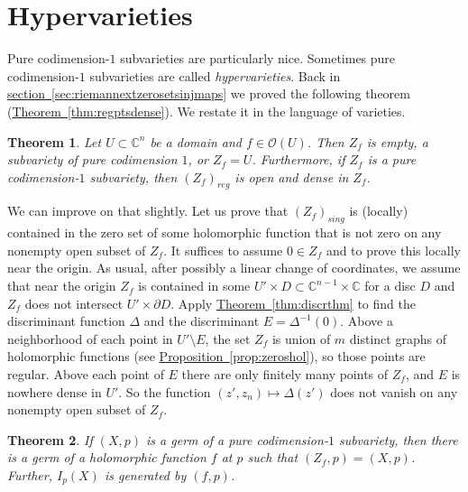 \documentclass[12pt,openany]{book}
\newcommand{\C}{{\mathbb{C}}}
\newcommand{\sO}{{\mathscr{O}}}
\theoremstyle{plain}
\newtheorem{thm}{Theorem}[section]
\theoremstyle{remark}
\theoremstyle{definition}
\theoremstyle{exercise}
\theoremstyle{example}
\newcommand{\sectionref}[1]{\hyperref[#1]{section~\ref*{#1}}}
\newcommand{\thmref}[1]{\hyperref[#1]{Theorem~\ref*{#1}}}
\newcommand{\propref}[1]{\hyperref[#1]{Proposition~\ref*{#1}}}
\begin{document}

\section{Hypervarieties} \label{section:hypervarieties}


Pure codimension-$1$ subvarieties are particularly nice.
Sometimes pure codimension-$1$ subvarieties are called
\emph{hypervarieties}.
Back in \sectionref{sec:riemannextzerosetsinjmaps} we proved
the following theorem (\thmref{thm:regptsdense}).  We restate it in the
language of varieties.

\begin{thm} \label{thm:regptsdense2}
Let $U \subset \C^n$ be a domain and
$f \in \sO(U)$.  Then $Z_f$ is empty, a subvariety of pure codimension $1$, or
$Z_f = U$.
Furthermore, if $Z_f$ is a pure codimension-$1$ subvariety, then
$(Z_f)_{\mathit{reg}}$ is open and dense in $Z_f$.
\end{thm}

We can improve on that slightly.
Let us prove that $(Z_f)_{\mathit{sing}}$ is (locally) contained in the zero set of some holomorphic
function that is not zero on any nonempty open subset of $Z_f$.
It suffices to assume $0 \in Z_f$ and to prove this locally near the origin.
As usual, after possibly a linear change of coordinates, we assume
that near the origin $Z_f$ is contained in some $U' \times D \subset
\C^{n-1} \times \C$ for a disc $D$ and $Z_f$ does not
intersect $U' \times \partial D$.
Apply \thmref{thm:discrthm} to find
the discriminant function
$\Delta$ and the discriminant $E = \Delta^{-1}(0)$.
Above a neighborhood of each
point in $U' \setminus E$, the set $Z_f$ is union of $m$ distinct graphs
of holomorphic functions (see \propref{prop:zeroshol}), so those
points are regular.  Above
each point of $E$ there are only finitely many points of $Z_f$,
and $E$ is nowhere dense in $U'$.  So the
function $(z',z_n) \mapsto \Delta(z')$ does not vanish on any nonempty open
subset of $Z_f$.

\begin{thm} \label{thm:codim1var}
If $(X,p)$ is a germ of a pure codimension-$1$ subvariety, then
there is a germ of a holomorphic function $f$ at $p$
such that $(Z_f,p) = (X,p)$.  Further, $I_p(X)$ is generated by $(f,p)$.
\end{thm}
\end{document}
